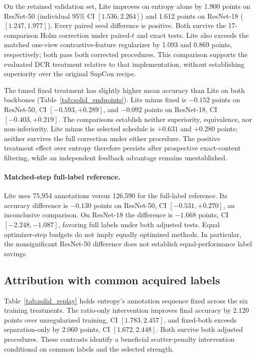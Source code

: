 \documentclass[10pt,a4paper,twocolumn]{article}
\begin{document}
On the retained validation set, Lite improves on entropy alone by
1.900 points on ResNet-50 (individual 95\% CI $[1.536,2.264]$)
and 1.612 points on ResNet-18 ($[1.247,1.977]$). Every paired seed
difference is positive. Both survive the 17-comparison Holm correction
under paired-$t$ and exact tests. Lite also exceeds the matched
one-view contrastive-feature regularizer by 1.093 and 0.869 points,
respectively; both pass both corrected procedures. This comparison
supports the evaluated DCR treatment relative to that implementation,
without establishing superiority over the original SupCon recipe.

The tuned fixed treatment has slightly higher mean accuracy than Lite
on both backbones (Table~\ref{tab:solid_endpoints}). Lite minus fixed
is $-0.152$ points on ResNet-50, CI $[-0.593,+0.289]$, and $-0.092$
points on ResNet-18, CI $[-0.403,+0.219]$. The comparisons establish
neither superiority, equivalence, nor non-inferiority. Lite minus the
selected schedule is $+0.631$ and $+0.280$ points; neither survives
the full correction under either procedure. The positive treatment
effect over entropy therefore persists after prospective exact-content
filtering, while an independent feedback advantage remains unestablished.

\paragraph{Matched-step full-label reference.}
Lite uses 75,954 annotations versus 126,590 for the full-label reference.
Its accuracy difference is $-0.130$ points on ResNet-50,
CI $[-0.531,+0.270]$, an inconclusive comparison. On ResNet-18 the
difference is $-1.668$ points, CI $[-2.248,-1.087]$, favoring full
labels under both adjusted tests. Equal optimizer-step budgets do not
imply equally optimized methods. In particular, the nonsignificant
ResNet-50 difference does not establish equal-performance label savings.

\subsection{Attribution with common acquired labels}
\label{sec:component_results}

Table~\ref{tab:solid_replay} holds entropy's annotation sequence fixed
across the six training treatments. The ratio-only intervention improves
final accuracy by 2.120 points over unregularized training,
CI $[1.783,2.457]$, and fixed-both exceeds separation-only by
2.060 points, CI $[1.672,2.448]$. Both survive both adjusted procedures.
These contrasts identify a beneficial scatter-penalty intervention
conditional on common labels and the selected strength.
\end{document}
